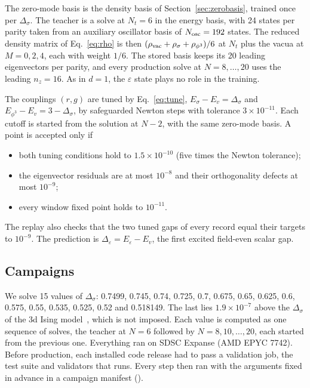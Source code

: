 The zero-mode basis is the density basis of Section~\ref{sec:zerobasis}, trained once per $\Delta_\sigma$. The teacher
is a solve at $N_t=6$ in the energy basis, with 24 states per parity taken from an auxiliary oscillator basis of
$N_{\rm osc}=192$ states. The reduced density matrix of Eq.~\eqref{eq:rho} is then
$(\rho_{\rm vac}+\rho_\sigma+\rho_{\phi^3})/6$ at $N_t$ plus the vacua at $M=0,2,4$, each with weight $1/6$. The stored
basis keeps its 20 leading eigenvectors per parity, and every production solve at $N=8,\dots,20$ uses the leading
$n_z=16$. %
As in $d=1$, the $\varepsilon$ state plays no role in the training.

The couplings $(r,g)$ are tuned by Eq.~\eqref{eq:tune}, $E_\sigma-E_v=\Delta_\sigma$ and
$E_{\phi^3}-E_v=3-\Delta_\sigma$, by safeguarded Newton steps with tolerance $3\times10^{-11}$. Each cutoff is started
from the solution at $N-2$, with the same zero-mode basis. A point is accepted only if
\begin{itemize}
\item both tuning conditions hold to $1.5\times10^{-10}$ (five times the Newton tolerance);
\item the eigenvector residuals are at most $10^{-8}$ and their orthogonality defects at most $10^{-9}$;
\item every window fixed point holds to $10^{-11}$. %
\end{itemize}
The replay also checks that the two tuned gaps of every record equal their targets to $10^{-9}$. The prediction is
$\Delta_\varepsilon=E_\varepsilon-E_v$, the first excited field-even scalar gap.

\subsection{Campaigns}\label{d3:campaigns}

We solve 15 values of $\Delta_\sigma$: 0.7499, 0.745, 0.74, 0.725, 0.7, 0.675, 0.65, 0.625, 0.6, 0.575, 0.55, 0.535,
0.525, 0.52 and 0.518149. The last lies $1.9\times10^{-7}$ above the $\Delta_\sigma$ of the 3d Ising
model~\cite{Chang:2024whx}, which is not imposed. Each value is computed as one sequence of solves, the teacher at
$N=6$ followed by $N=8,10,\dots,20$, each started from the previous one. Everything ran on SDSC Expanse (AMD EPYC
7742). Before production, each installed code release had to pass a validation job, the test suite and validators
that  runs. Every step then ran with the arguments fixed in advance in a campaign manifest
().

